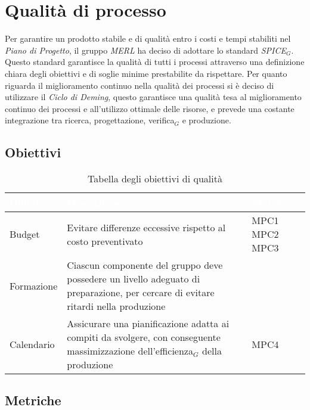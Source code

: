 \chapter{Qualità di processo}
Per garantire un prodotto stabile e di qualità entro i costi e tempi stabiliti nel \textit{Piano di Progetto}, il gruppo \textit{MERL} ha deciso di adottare lo standard \textit{SPICE}$_G$. Questo standard garantisce la qualità di tutti i processi attraverso una definizione chiara degli obiettivi e di soglie minime prestabilite da rispettare.
Per quanto riguarda il miglioramento continuo nella qualità dei processi si è deciso di utilizzare il \textit{Ciclo di Deming}, questo garantisce una qualità tesa al miglioramento continuo dei processi e all'utilizzo ottimale delle risorse, e prevede una costante integrazione tra ricerca, progettazione, verifica$_G$ e produzione.

\section{Obiettivi}
\begin{table}[H]
  \renewcommand{\arraystretch}{1.25}
  \begin{tabular}{|p{2.5cm}|p{8cm}|p{1.7cm}|} \hline
    \rowcolor[HTML]{036400}
    \textcolor{white}{\textbf{Obiettivo}} & \textcolor{white}{\textbf{Descrizione}} & \textcolor{white}{\textbf{Metrica}}  \\ \hline
    \rowcolor[HTML]{EFEFEF}
    Budget & Evitare differenze eccessive rispetto al costo preventivato & MPC1 \newline MPC2 \newline MPC3     \\ \hline
    \rowcolor[HTML]{C0C0C0}
    Formazione & Ciascun componente del gruppo deve possedere un livello adeguato di preparazione, per cercare di evitare ritardi nella produzione   & \    \\ \hline
    \rowcolor[HTML]{EFEFEF}
    Calendario & Assicurare una pianificazione adatta ai compiti da svolgere, con conseguente massimizzazione dell'efficienza$_G$ della produzione  & MPC4       \\ \hline
  \end{tabular}
  \caption{Tabella degli obiettivi di qualità}
\end{table}

\newpage

\section{Metriche}

